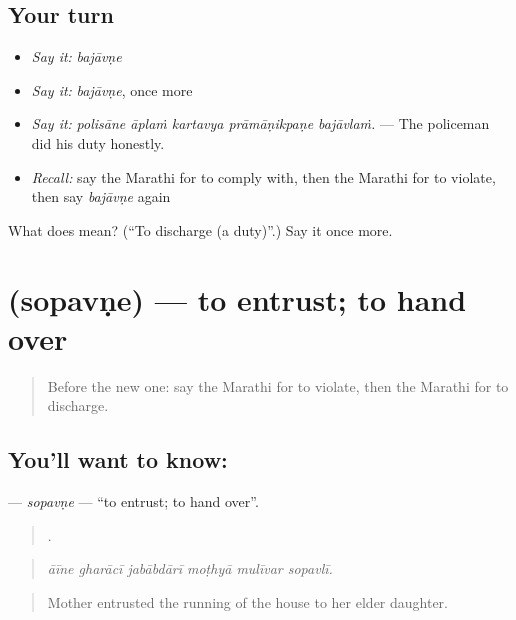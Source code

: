 \subsection*{Your turn}
\begin{itemize}
\raggedright
  \item \emph{Say it:} \emph{bajāvṇe}
  \item \emph{Say it:} \emph{bajāvṇe}, once more
  \item \emph{Say it:} \emph{polisāne āplaṁ kartavya prāmāṇikpaṇe bajāvlaṁ.} — The policeman did his duty honestly.
  \item \emph{Recall:} say the Marathi for to comply with, then the Marathi for to violate, then say \emph{bajāvṇe} again
\end{itemize}

\begin{tcolorbox}[breakable,colback=teal!4,colframe=teal!35!black,title={Before you move on}]
What does  mean? (\textquotedblleft{}To discharge (a duty)\textquotedblright{}.) Say it once more.
\end{tcolorbox}
\section[\texorpdfstring{\mr{सोपवणे} (sopavṇe)}{सोपवणे (sopavṇe)}]{ (sopavṇe) — to entrust; to hand over}

\label{lesson:MR-C368-sopavne}



\begin{quote}
Before the new one: say the Marathi for to violate, then the Marathi for to discharge.
\end{quote}

\subsection*{You'll want to know: }
\textbf{} — \emph{sopavṇe} — \textquotedblleft{}to entrust; to hand over\textquotedblright{}.

\begin{quote}
     .
\end{quote}

\begin{quote}
\emph{āīne gharācī jabābdārī moṭhyā mulīvar sopavlī.}
\end{quote}

\begin{quote}
Mother entrusted the running of the house to her elder daughter.
\end{quote}

